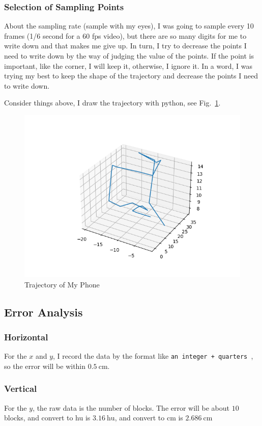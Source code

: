 \documentclass{article}
\begin{document}
\subsubsection{Selection of Sampling Points}

About the sampling rate (sample with my eyes), I was going to sample every 10 frames (1/6 second for a $60$ fps video), but there are so many digits for me to write down and that makes me give up. In turn, I try to decrease the points I need to write down by the way of judging the value of the points. If the point is important, like the corner, I will keep it, otherwise, I ignore it. In a word, I was trying my best to keep the shape of the trajectory and decrease the points I need to write down.

Consider things above, I draw the trajectory with python, see Fig.~\ref{fig:trajectoryOfMyPhone}.

\begin{figure}[!h]
	\centering
	\includegraphics[width=4 in]{../pic/trajectoryOfMyPhone.png}
	\caption{Trajectory of My Phone}
	\label{fig:trajectoryOfMyPhone}
\end{figure}

\subsection{Error Analysis}
\subsubsection{Horizontal}
For the $x$ and $y$, I record the data by the format like \verb|an integer + quarters |, so the error will be within $0.5 ~ \mathrm{cm}$.
\subsubsection{Vertical}
For the $y$, the raw data is the number of blocks. The error will be about $10$ blocks, and convert to hu is $3.16 ~ \mathrm{hu}$, and convert to cm is $2.686~ \mathrm{cm}$
\end{document}
